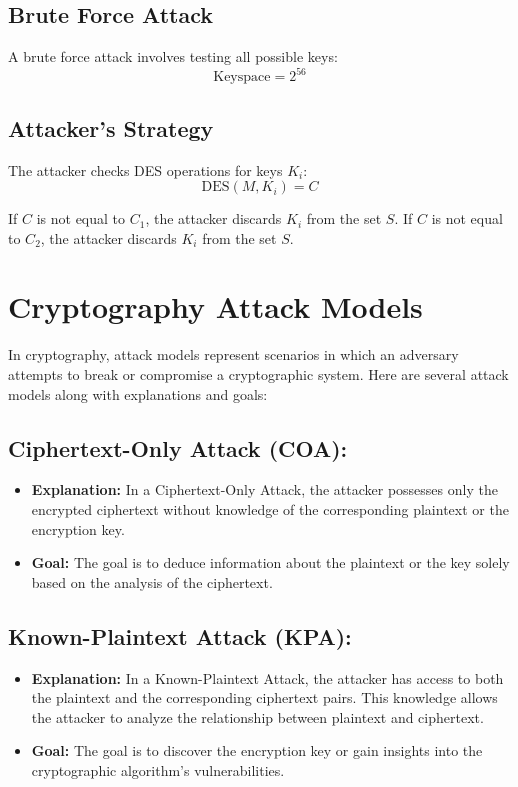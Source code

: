 \documentclass[11pt]{article}
\begin{document}
\subsection*{Brute Force Attack}
A brute force attack involves testing all possible keys:
\[ \text{Keyspace} = 2^{56} \]

\subsection*{Attacker's Strategy}
The attacker checks DES operations for keys \(K_i\):
\[ \text{DES}(M, K_i) = C \]

If \(C\) is not equal to \(C_1\), the attacker discards \(K_i\) from the set \(S\).
If \(C\) is not equal to \(C_2\), the attacker discards \(K_i\) from the set \(S\).

\section*{Cryptography Attack Models}

In cryptography, attack models represent scenarios in which an adversary attempts to break or compromise a cryptographic system. Here are several attack models along with explanations and goals:

\subsection*{Ciphertext-Only Attack (COA):}
\begin{itemize}
    \item \textbf{Explanation:} In a Ciphertext-Only Attack, the attacker possesses only the encrypted ciphertext without knowledge of the corresponding plaintext or the encryption key.
    \item \textbf{Goal:} The goal is to deduce information about the plaintext or the key solely based on the analysis of the ciphertext.
\end{itemize}

\subsection*{Known-Plaintext Attack (KPA):}
\begin{itemize}
    \item \textbf{Explanation:} In a Known-Plaintext Attack, the attacker has access to both the plaintext and the corresponding ciphertext pairs. This knowledge allows the attacker to analyze the relationship between plaintext and ciphertext.
    \item \textbf{Goal:} The goal is to discover the encryption key or gain insights into the cryptographic algorithm's vulnerabilities.
\end{itemize}
\end{document}
